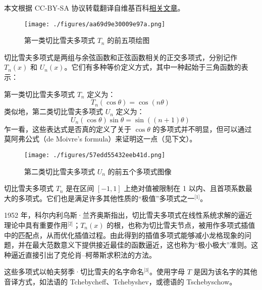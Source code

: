 
本文根据 CC-BY-SA 协议转载翻译自维基百科\href{https://en.wikipedia.org/wiki/Hermann_von_Helmholtz}{相关文章}。

\begin{figure}[ht]
\centering
\texttt{[image: ./figures/aa69d9e30009e97a.png]}
\caption{第一类切比雪夫多项式 $T_n$ 的前五项绘图} \label{fig_QBXFdx_1}
\end{figure}
切比雪夫多项式是两组与余弦函数和正弦函数相关的正交多项式，分别记作 $T_n(x)$ 和 $U_n(x)$。它们有多种等价定义方式，其中一种起始于三角函数的表示：

第一类切比雪夫多项式 $T_n$ 定义为：
$$
T_n(\cos \theta) = \cos(n\theta)~
$$
类似地，第二类切比雪夫多项式 $U_n$ 定义为：
$$
U_n(\cos \theta)\sin \theta = \sin((n+1)\theta)~
$$
乍一看，这些表达式是否真的定义了关于 $\cos \theta$ 的多项式并不明显，但可以通过莫阿弗公式（de Moivre’s formula）来证明这一点（见下文）。
\begin{figure}[ht]
\centering
\texttt{[image: ./figures/57edd55432eeb41d.png]}
\caption{第二类切比雪夫多项式 $U_n$ 的前五个多项式图像} \label{fig_QBXFdx_2}
\end{figure}
切比雪夫多项式 $T_n$ 是在区间 $[-1, 1]$ 上绝对值被限制在 1 以内、且首项系数最大的多项式。它们也是满足许多其他性质的“极值”多项式之一\(^\text{[1]}\)。

1952 年，科尔内利乌斯·兰齐奥斯指出，切比雪夫多项式在线性系统求解的逼近理论中具有重要作用\(^\text{[2]}\)；$T_n(x)$ 的根，也称为切比雪夫节点，被用作多项式插值中的匹配点，从而优化插值过程。由此得到的插值多项式能够减小龙格现象的问题，并在最大范数意义下提供接近最佳的函数逼近，这也称为“极小极大”准则。这种逼近直接引出了克伦肖–柯蒂斯求积法的方法。

这些多项式以帕夫努季·切比雪夫的名字命名\(^\text{[3]}\)。使用字母 $T$ 是因为该名字的其他音译方式，如法语的 Tchebycheff、Tchebyshev，或德语的 Tschebyschow。
